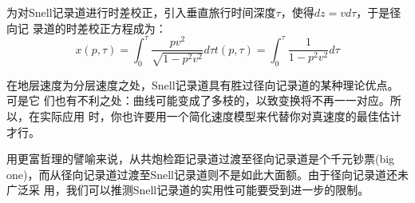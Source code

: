 为对Snell记录道进行时差校正，引入垂直旅行时间深度$\tau$，使得$dz=vd\tau$，于是径向记
录道的时差校正方程成为：
\begin{subequations}
\begin{equation}
x(p,\tau)=\int_0^\tau \frac{pv^2}{\sqrt{1-p^2v^2}}d\tau
\label{eq:ex5.1.5a}
\end{equation}
\begin{equation}
t(p,\tau)=\int_0^\tau \frac{1}{1-p^2v^2}d\tau
\label{eq:ex5.1.5b}
\end{equation}
\label{eq:ex5.1.5}
\end{subequations}

在地层速度为分层速度之处，Snell记录道具有胜过径向记录道的某种理论优点。可是它
们也有不利之处：曲线可能变成了多枝的，以致变换将不再一一对应。所以，在实际应用
时，你也许要用一个简化速度模型来代替你对真速度的最佳估计才行。

用更富哲理的譬喻来说，从共炮检距记录道过渡至径向记录道是个千元钞票(big
one)，而从径向记录道过渡至Snell记录道则不是如此大面额。由于径向记录道还未广泛采
用，我们可以推测Snell记录道的实用性可能要受到进一步的限制。



